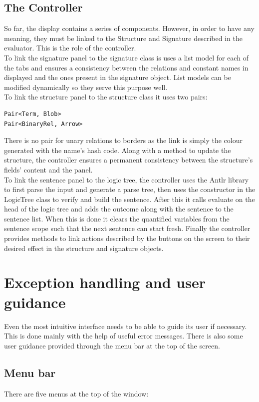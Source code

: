 \documentclass{report}
\begin{document}
\subsection{The Controller}
So far, the display contains a series of components. However, in order to have 
any meaning, they must be linked to the Structure and Signature described in the 
evaluator. This is the role of the controller.\\
To link the signature panel to the signature class is uses a list model for each 
of the tabs and ensures a consistency between the relations and constant names 
in displayed and the ones present in the signature object. List models can be 
modified dynamically so they serve this purpose well.\\
To link the structure panel to the structure class it uses two pairs:
\begin{verbatim}
Pair<Term, Blob>
Pair<BinaryRel, Arrow>
\end{verbatim}
There is no pair for unary relations to borders as the link is simply the colour 
generated with the name's hash code. Along with a method to update the 
structure, the controller ensures a permanent consistency between the 
structure's fields' content and the panel.\\
To link the sentence panel to the logic tree, the controller uses the Antlr 
library to first parse the input and generate a parse tree, then uses the 
constructor in the LogicTree class to verify and build the sentence. After this 
it calls evaluate on the head of the logic tree and adds the outcome along with 
the sentence to the sentence list. When this is done it clears the quantified 
variables from the sentence scope such that the next sentence can start fresh.
Finally the controller provides methods to link actions described by the buttons 
on the screen to their desired effect in the structure and signature objects.

\section{Exception handling and user guidance}
Even the most intuitive interface needs to be able to guide its user if 
necessary. This is done mainly with the help of useful error messages. There is 
also some user guidance provided through the menu bar at the top of the screen. 

\subsection{Menu bar}
There are five menus at the top of the window:
\end{document}
